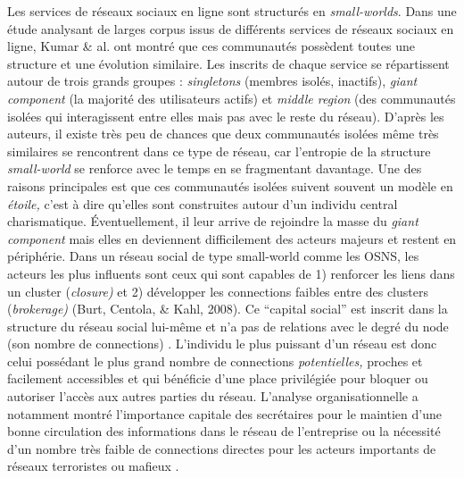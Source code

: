 Les services de r\'eseaux sociaux en ligne sont structur\'es en
\textit{small-worlds}. Dans une \'etude analysant de larges corpus
issus de diff\'erents services de r\'eseaux sociaux en ligne, Kumar \&
al. \citep{Kumar2006} ont montr\'e que ces communaut\'es poss\`edent toutes une
structure et une \'evolution similaire. Les inscrits de chaque service
se r\'epartissent autour de trois grands groupes : \textit{singletons}
(membres isol\'es, inactifs), \textit{giant component} (la majorit\'e
des utilisateurs actifs) et \textit{middle region} (des communaut\'es
isol\'ees qui interagissent entre elles mais pas avec le reste du
r\'eseau). D{\textquoteright}apr\`es les auteurs, il existe tr\`es peu
de chances que deux communaut\'es isol\'ees m\^eme tr\`es similaires se
rencontrent dans ce type de r\'eseau, car l{\textquoteright}entropie de
la structure \textit{small-world }se renforce avec le temps en se
fragmentant davantage. Une des raisons principales est que ces
communaut\'es isol\'ees suivent souvent un mod\`ele en
\textit{\'etoile, }c{\textquoteright}est \`a dire
qu{\textquoteright}elles sont construites autour d{\textquoteright}un
individu central charismatique. \'Eventuellement, il leur arrive de
rejoindre la masse du \textit{giant component} mais elles en deviennent
difficilement des acteurs majeurs et restent en p\'eriph\'erie. Dans un
r\'eseau social de type small-world comme les OSNS, les acteurs les
plus influents sont ceux qui sont capables de 1) renforcer les liens
dans un cluster (\textit{closure)} et 2) d\'evelopper les connections
faibles entre des clusters (\textit{brokerage)} (Burt, Centola, \&
Kahl, 2008). Ce {\textquotedblleft}capital social{\textquotedblright}
est inscrit dans la structure du r\'eseau social lui-m\^eme \citep{Lin1999}
et n{\textquoteright}a pas de relations avec le degr\'e du node (son
nombre de connections) \citep{Cha2010}. L{\textquoteright}individu
le plus puissant d{\textquoteright}un r\'eseau est donc celui
poss\'edant le plus grand nombre de connections \textit{potentielles,
}proches et facilement accessibles et qui b\'en\'eficie
d{\textquoteright}une place privil\'egi\'ee pour bloquer ou autoriser
l{\textquoteright}acc\`es aux autres parties du r\'eseau.
L{\textquoteright}analyse organisationnelle a notamment montr\'e
l{\textquoteright}importance capitale des secr\'etaires pour le
maintien d{\textquoteright}une bonne circulation des informations dans
le r\'eseau de l{\textquoteright}entreprise ou la n\'ecessit\'e
d{\textquoteright}un nombre tr\`es faible de connections directes pour
les acteurs importants de r\'eseaux terroristes ou mafieux \citep{Russel2011}. 

